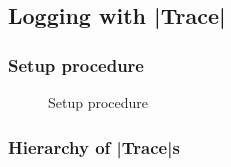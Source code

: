 

\subsection{Logging with |Trace|}

\subsubsection{Setup procedure}

\begin{figure}[htp]
\caption{Setup procedure}\label{fig:setup}
\end{figure}

\subsubsection{Hierarchy of |Trace|s}
